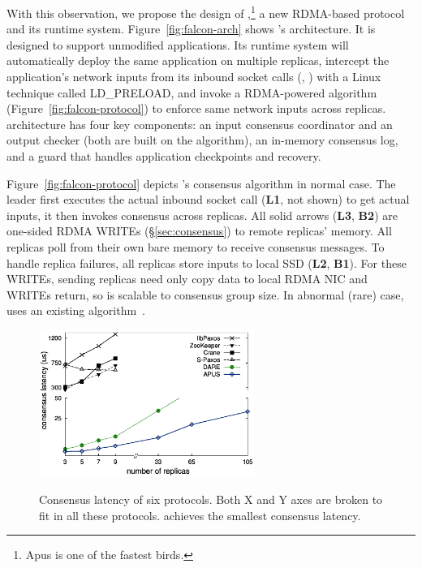 With this observation, we propose the design of \falcon,\footnote{Apus is one 
of the fastest birds.} a new RDMA-based \paxos 
protocol and its runtime system. Figure~\ref{fig:falcon-arch} shows \falcon's 
architecture. It is designed to support unmodified applications. Its runtime 
system will automatically deploy the same application on multiple replicas, 
intercept the application's network inputs from its inbound socket calls (\eg, 
\recv) with a Linux technique called LD\_PRELOAD, and invoke a RDMA-powered 
algorithm (Figure~\ref{fig:falcon-protocol}) to enforce same network inputs 
across replicas. \falcon architecture has four key components: an input 
consensus coordinator and an output checker (both are built on the algorithm), 
an in-memory consensus log, and a guard that handles application checkpoints 
and recovery.

Figure~\ref{fig:falcon-protocol} depicts \falcon's consensus algorithm in 
normal case. The leader first executes the actual inbound socket call 
(\textbf{L1}, not shown) to get actual inputs, it then invokes consensus across 
replicas. All solid arrows (\textbf{L3}, \textbf{B2}) are one-sided RDMA WRITEs 
(\S\ref{sec:consensus}) to remote replicas' memory. All replicas poll from their 
own bare memory to receive consensus messages. To handle replica failures, all 
replicas store inputs to local SSD (\textbf{L2}, \textbf{B1}). For these WRITEs, 
sending replicas need only copy data to local RDMA NIC and WRITEs return, so
\falcon is scalable to consensus group size. In abnormal (rare) case, \falcon 
uses an existing algorithm~\cite{paxos:practical}.




\begin{figure}
  \vspace{-.1in}
  \includegraphics[width=7cm]{figures/traditional_paxos_latency.ps}\\
  \vspace{-.3in}
  \caption{Consensus latency of six \paxos protocols. Both X and Y axes are 
broken to fit in all these protocols. \falcon achieves the smallest consensus 
latency.}
  \label{fig:scalability}
\end{figure}

